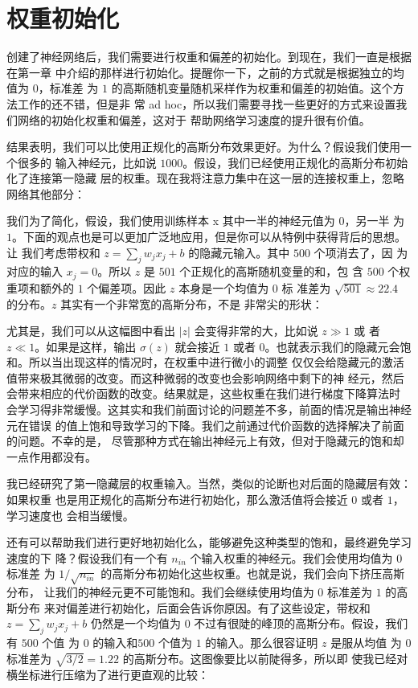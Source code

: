 \section{权重初始化}
\label{sec:weight_initialization}

创建了神经网络后，我们需要进行权重和偏差的初始化。到现在，我们一直是根据在第一章
中介绍的那样进行初始化。提醒你一下，之前的方式就是根据独立的均值为 $0$，标准差
为 $1$ 的高斯随机变量随机采样作为权重和偏差的初始值。这个方法工作的还不错，但是非
常 ad hoc，所以我们需要寻找一些更好的方式来设置我们网络的初始化权重和偏差，这对于
帮助网络学习速度的提升很有价值。

结果表明，我们可以比使用正规化的高斯分布效果更好。为什么？假设我们使用一个很多的
输入神经元，比如说 $1000$。假设，我们已经使用正规化的高斯分布初始化了连接第一隐藏
层的权重。现在我将注意力集中在这一层的连接权重上，忽略网络其他部分：

我们为了简化，假设，我们使用训练样本 x 其中一半的神经元值为 $0$，另一半
为 $1$。下面的观点也是可以更加广泛地应用，但是你可以从特例中获得背后的思想。让
我们考虑带权和 $z=\sum_j w_j x_j + b$ 的隐藏元输入。其中 $500$ 个项消去了，因
为对应的输入 $x_j=0$。所以 $z$ 是 $501$ 个正规化的高斯随机变量的和，包
含 $500$ 个权重项和额外的 $1$ 个偏差项。因此 $z$ 本身是一个均值为 $0$ 标
准差为 $\sqrt{501}\approx 22.4$ 的分布。$z$ 其实有一个非常宽的高斯分布，不是
非常尖的形状：

尤其是，我们可以从这幅图中看出 $|z|$ 会变得非常的大，比如说 $z\gg1$ 或
者 $z\ll 1$。如果是这样，输出 $\sigma(z)$ 就会接近 $1$ 或者
$0$。也就表示我们的隐藏元会饱和。所以当出现这样的情况时，在权重中进行微小的调整
仅仅会给隐藏元的激活值带来极其微弱的改变。而这种微弱的改变也会影响网络中剩下的神
经元，然后会带来相应的代价函数的改变。结果就是，这些权重在我们进行梯度下降算法时
会学习得非常缓慢。这其实和我们前面讨论的问题差不多，前面的情况是输出神经元在错误
的值上饱和导致学习的下降。我们之前通过代价函数的选择解决了前面的问题。不幸的是，
尽管那种方式在输出神经元上有效，但对于隐藏元的饱和却一点作用都没有。

我已经研究了第一隐藏层的权重输入。当然，类似的论断也对后面的隐藏层有效：如果权重
也是用正规化的高斯分布进行初始化，那么激活值将会接近 $0$ 或者 $1$，学习速度也
会相当缓慢。

还有可以帮助我们进行更好地初始化么，能够避免这种类型的饱和，最终避免学习速度的下
降？假设我们有一个有 $n_{in}$ 个输入权重的神经元。我们会使用均值为 $0$ 标准差
为 $1/\sqrt{n_{in}}$ 的高斯分布初始化这些权重。也就是说，我们会向下挤压高斯分布，
让我们的神经元更不可能饱和。我们会继续使用均值为 $0$ 标准差为 $1$ 的高斯分布
来对偏差进行初始化，后面会告诉你原因。有了这些设定，带权和 $z=\sum_j w_j x_j +
b$ 仍然是一个均值为 $0$ 不过有很陡的峰顶的高斯分布。假设，我们有 $500$ 个值
为 $0$ 的输入和$500$ 个值为 $1$ 的输入。那么很容证明 $z$ 是服从均值
为 $0$ 标准差为 $\sqrt{3/2} = 1.22$ 的高斯分布。这图像要比以前陡得多，所以即
使我已经对横坐标进行压缩为了进行更直观的比较：

